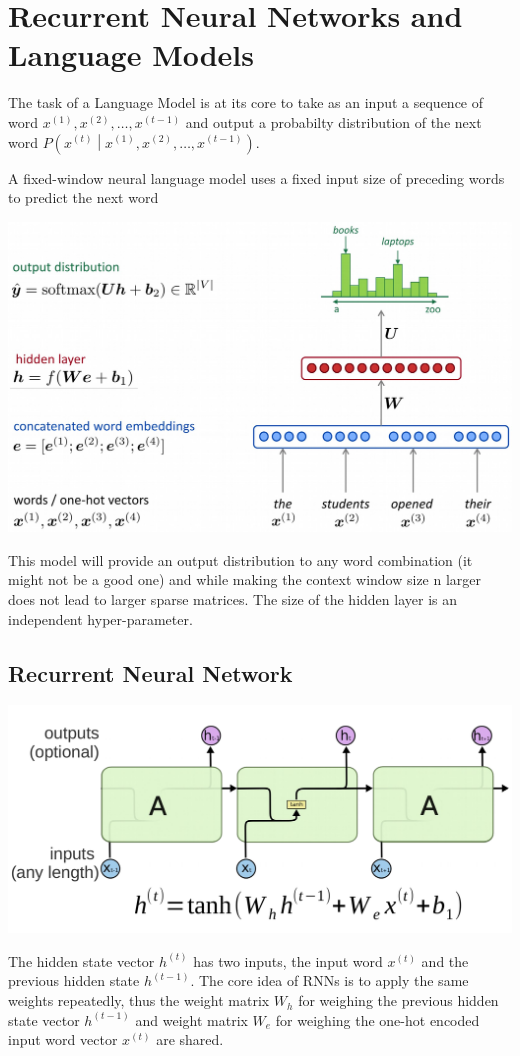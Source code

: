 \documentclass[11pt]{article}
\begin{document}
\section{Recurrent Neural Networks and Language Models}
The task of a Language Model is at its core to take as an input a sequence of word $x^{(1)}, x^{(2)}, \dots, x^{(t-1)}$ and output a probabilty distribution of the next word $P\left( x^{(t)} \middle| x^{(1)}, x^{(2)}, \dots, x^{(t-1)} \right)$.

A fixed-window neural language model uses a fixed input size of preceding words to predict the next word
\begin{center}

	\includegraphics[width=0.6\linewidth]{img/fixed_window_nlm}
\end{center}
This model will provide an output distribution to any word combination (it might not be a good one) and while making the context window size n larger does not lead to larger sparse matrices. The size of the hidden layer is an independent hyper-parameter.

\subsection{Recurrent Neural Network}
\begin{center}
	\includegraphics[width=0.7\linewidth]{img/recurrent_neural_network}
\end{center}
The hidden state vector $h^{(t)}$ has two inputs, the input word $x^{(t)}$ and the previous hidden state $h^{(t-1)}$. The core idea of RNNs is to apply the same weights repeatedly, thus the weight matrix $W_h$ for weighing the previous hidden state vector $h^{(t-1)}$ and weight matrix $W_e$ for weighing the one-hot encoded input word vector $x^{(t)}$ are shared.
\end{document}
